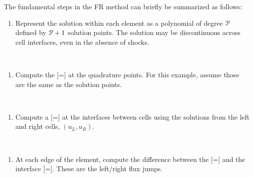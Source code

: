 
The fundamental steps in the FR method can briefly
be summarized as follows:
\newline
\newlength{\lenColA}
\newlength{\lenColB}
\setlength{\lenColA}{0.5\textwidth}
\setlength{\lenColB}{0.5\textwidth}
\begin{minipage}{\lenColA}
\begin{enumerate}
\item[1.]
Represent the solution within each element as a polynomial of degree ${\cal P}$
defined by ${\cal P}+1$ solution points.
The solution may be discontinuous across cell interfaces,
even in the absence of shocks.
\end{enumerate}
\end{minipage}%
\begin{minipage}{\lenColB}
\end{minipage}%
\\
\begin{minipage}{\lenColA}
\begin{enumerate}
\item[2.]
Compute the [=]
at the quadrature points.
For this example, assume those are the same as the solution points.
\end{enumerate}
\end{minipage}%
\begin{minipage}{\lenColB}
\end{minipage}%
\\
\begin{minipage}{\lenColA}
\begin{enumerate}
\item[3.]
Compute a [=]
at the interfaces between cells using the solutions from the left and right
cells, $\left(u_L,u_R\right)$.
\end{enumerate}
\end{minipage}%
\begin{minipage}{\lenColB}
\end{minipage}%
\\
\begin{minipage}{\lenColA}
\begin{enumerate}
\item[4.]
At each edge of the element, compute the difference between the
[=]
and the interface [=].
These are the left\slash right flux jumps.
\end{enumerate}
\end{minipage}%
